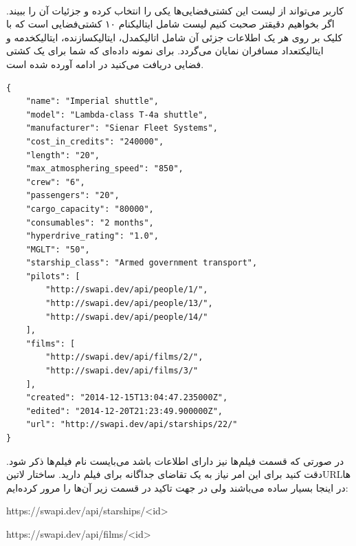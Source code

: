 \documentclass[../main.tex]{subfiles}
\begin{document}
\paragraph{}
کاربر می‌تواند از لیست این کشتی‌فضایی‌ها یکی را انتخاب کرده و جزئیات آن را ببیند.
اگر بخواهیم دقیقتر صحبت کنیم لیست شامل ‌ایتالیک{نام} ۱۰ کشتی‌فضایی است
که با کلیک بر روی هر یک اطلاعات جزئی آن شامل ‌اتالیک{مدل}، ‌ایتالیک{سازنده}، ‌ایتالیک{خدمه} و ‌ایتالیک{تعداد مسافران} نمایان می‌گردد.
برای نمونه داده‌ای که شما برای یک کشتی فضایی دریافت می‌کنید در ادامه آورده شده است.

\begin{latin}
\begin{verbatim}
{
    "name": "Imperial shuttle",
    "model": "Lambda-class T-4a shuttle",
    "manufacturer": "Sienar Fleet Systems",
    "cost_in_credits": "240000",
    "length": "20",
    "max_atmosphering_speed": "850",
    "crew": "6",
    "passengers": "20",
    "cargo_capacity": "80000",
    "consumables": "2 months",
    "hyperdrive_rating": "1.0",
    "MGLT": "50",
    "starship_class": "Armed government transport",
    "pilots": [
        "http://swapi.dev/api/people/1/",
        "http://swapi.dev/api/people/13/",
        "http://swapi.dev/api/people/14/"
    ],
    "films": [
        "http://swapi.dev/api/films/2/",
        "http://swapi.dev/api/films/3/"
    ],
    "created": "2014-12-15T13:04:47.235000Z",
    "edited": "2014-12-20T21:23:49.900000Z",
    "url": "http://swapi.dev/api/starships/22/"
}
\end{verbatim}
\end{latin}

در صورتی که قسمت فیلم‌ها نیز دارای اطلاعات باشد می‌بایست نام فیلم‌ها ذکر شود.
دقت کنید برای این امر نیاز به یک تقاضای جداگانه برای فیلم دارید. ساختار ‌لاتین{URL}ها در اینجا بسیار ساده می‌باشند ولی در جهت تاکید در قسمت زیر آن‌ها را مرور کرده‌ایم:

\begin{itemize}\begin{latinitems}
  \item https://swapi.dev/api/starships/<id>
  \item https://swapi.dev/api/films/<id>
\end{latinitems}\end{itemize}

\end{document}
